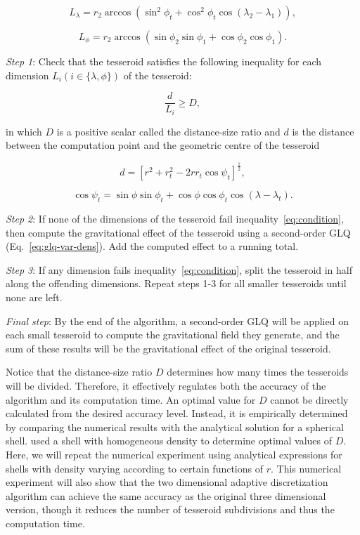 \documentclass[extra, referee]{gji}
\begin{document}
\begin{equation}
    L_\lambda = r_2 \arccos(\sin^2\phi_t +
        \cos^2\phi_t\cos(\lambda_2 - \lambda_1)),
    \label{eq:sizelon}
\end{equation}

\begin{equation}
    L_\phi = r_2 \arccos(\sin\phi_2\sin\phi_1 + \cos\phi_2\cos\phi_1).
\end{equation}

\textit{Step 1}: Check that the tesseroid satisfies the following inequality for each
dimension $L_i (i \in \{\lambda, \phi\})$ of the tesseroid:

\begin{equation}
    \frac{d}{L_i} \geq D,
    \label{eq:condition}
\end{equation}

\noindent
in which $D$ is a positive scalar called the distance-size ratio and $d$ is the distance
between the computation point and the geometric centre of the tesseroid

\begin{equation}
    d = \left[
        r^2 + r_t^2 - 2 r r_t \cos\psi_t
        \right]^{\frac{1}{2}} ,
    \label{eq:distance}
\end{equation}

\begin{equation}
    \cos\psi_t =
        \sin\phi\sin\phi_t + \cos\phi\cos\phi_t\cos(\lambda - \lambda_t).
\end{equation}

\textit{Step 2}:
If none of the dimensions of the tesseroid fail inequality~\ref{eq:condition}, then
compute the gravitational effect of the tesseroid using a second-order GLQ
(Eq.~\ref{eq:glq-var-dens}).
Add the computed effect to a running total.

\textit{Step 3}:
If any dimension fails inequality~\ref{eq:condition}, split the tesseroid in half along
the offending dimensions.
Repeat steps 1-3 for all smaller tesseroids until none are left.

\textit{Final step}:
By the end of the algorithm, a second-order GLQ will be applied on each small tesseroid
to compute the gravitational field they generate, and the sum of these results will be
the gravitational effect of the original tesseroid.

Notice that the distance-size ratio $D$ determines how many
times the tesseroids will be divided.
Therefore, it effectively regulates both the accuracy of the algorithm and its
computation time.
An optimal value for $D$ cannot be directly calculated from the desired accuracy level.
Instead, it is empirically determined by comparing the numerical results with the
analytical solution for a spherical shell.
\citet{Uieda2016} used a shell with homogeneous density to determine optimal values of
$D$.
Here, we will repeat the numerical experiment using analytical expressions for shells
with density varying according to certain functions of $r$.
This numerical experiment will also show that the two dimensional adaptive
discretization algorithm can achieve the same accuracy as the original three dimensional
version, though it reduces the number of tesseroid subdivisions and thus the computation
time.
\end{document}
